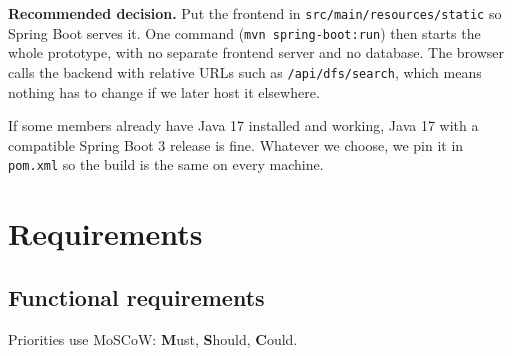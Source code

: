 \documentclass[11pt,a4paper]{article}
\newcommand{\code}[1]{\texttt{#1}}
\begin{document}
\textbf{Recommended decision.} Put the frontend in \code{src/main/resources/static} so Spring Boot
serves it. One command (\code{mvn spring-boot:run}) then starts the whole prototype, with no
separate frontend server and no database. The browser calls the backend with relative URLs such as
\code{/api/dfs/search}, which means nothing has to change if we later host it elsewhere.

If some members already have Java 17 installed and working, Java 17 with a compatible Spring Boot
3 release is fine. Whatever we choose, we pin it in \code{pom.xml} so the build is the same on
every machine.

\section{Requirements}
\label{sec:req}

\subsection{Functional requirements}

Priorities use MoSCoW: \textbf{M}ust, \textbf{S}hould, \textbf{C}ould.
\end{document}
